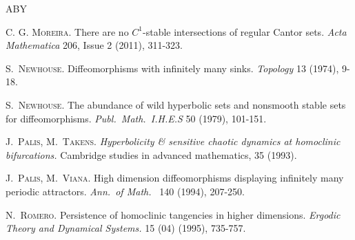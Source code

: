 \documentclass[11pt, a4paper]{amsart}
\theoremstyle{plain}
\theoremstyle{definition}
\theoremstyle{remark}
\numberwithin{equation}{section}         %
\begin{document}
\begin{thebibliography}{ABY}


\textsc{C. G. Moreira.}
There are no $C^1$-stable intersections of regular Cantor sets.
\textit{Acta Mathematica} 206, Issue 2 (2011), 311-323.



%

\textsc{S.~Newhouse.}
Diffeomorphisms with infinitely many sinks.
\textit{Topology} 13 (1974), 9-18.


\textsc{S.~Newhouse.}
The abundance of wild hyperbolic sets and nonsmooth stable sets for
diffeomorphisms.
\textit{Publ.\ Math.\ I.H.E.S} 50 (1979), 101-151.

%


\textsc{J.~Palis, M.~Takens.}
\textit{Hyperbolicity \& sensitive chaotic dynamics at homoclinic bifurcations.}
Cambridge studies in advanced mathematics, 35 (1993).

\textsc{J.~Palis, M.~Viana.}
High dimension diffeomorphisms displaying infinitely many
periodic attractors.
\textit{Ann.\ of Math.\ } 140 (1994), 207-250.




\textsc{N.~Romero.}
Persistence of homoclinic tangencies in higher dimensions.
\textit{Ergodic Theory and Dynamical Systems.}  15 (04) (1995),  735-757. 


\end{thebibliography}
\end{document}
